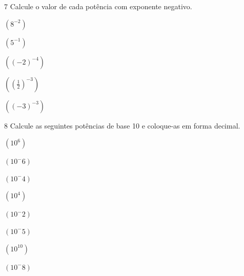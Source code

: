 \num{7} Calcule o valor de cada potência com exponente negativo.

\begin{escolha}[itemsep=0pt]
\item $(8^{-2})$ 
             
             
\item $(5^{-1})$ 
            
            
\item $((-2)^{-4})$
            
            
\item $((\frac{1}{2})^{-3}) $
           
            
\item $((-3)^{-3})$
            
            
            
             
\end{escolha}

\pagebreak

\num{8} Calcule as seguintes potências de base 10 e coloque-as em forma
decimal.

\begin{multicols}{2}
\begin{escolha}[itemsep=0pt]
\item $(10^6)$
   
\item $(10^-6)$
   
\item $(10^-4)$
   
\item $(10^4)$
   
\item $(10^-2)$
   
\item $(10 ^-5)$
   
\item $(10^10)$
   
\item $(10^-8)$
   
\end{escolha}
\end{multicols}

